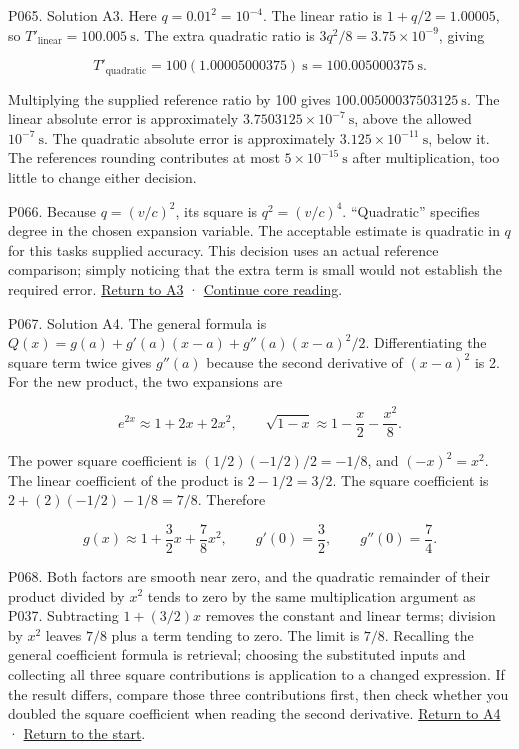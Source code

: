 \documentclass[
  11pt,
]{article}
\begin{document}
P065. Solution A3. Here \(q=0.01^2=10^{-4}\). The linear ratio is
\(1+q/2=1.00005\), so \(T'_{\mathrm{linear}}=100.005\ \mathrm{s}\). The
extra quadratic ratio is \(3q^2/8=3.75\times10^{-9}\), giving

\[
T'_{\mathrm{quadratic}}=100(1.00005000375)\ \mathrm{s}
=100.005000375\ \mathrm{s}.
\]

Multiplying the supplied reference ratio by 100 gives
\(100.00500037503125\ \mathrm{s}\). The linear absolute error is
approximately \(3.7503125\times10^{-7}\ \mathrm{s}\), above the allowed
\(10^{-7}\ \mathrm{s}\). The quadratic absolute error is approximately
\(3.125\times10^{-11}\ \mathrm{s}\), below it. The
reference\textquotesingle s rounding contributes at most
\(5\times10^{-15}\ \mathrm{s}\) after multiplication, too little to
change either decision.

P066. Because \(q=(v/c)^2\), its square is \(q^2=(v/c)^4\).
``Quadratic'' specifies degree in the chosen expansion variable. The
acceptable estimate is quadratic in \(q\) for this
task\textquotesingle s supplied accuracy. This decision uses an actual
reference comparison; simply noticing that the extra term is small would
not establish the required error. \protect\hyperlink{a3}{Return to A3} ·
\protect\hyperlink{after-a3}{Continue core reading}.

P067. Solution A4. The general formula is
\(Q(x)=g(a)+g'(a)(x-a)+g''(a)(x-a)^2/2\). Differentiating the square
term twice gives \(g''(a)\) because the second derivative of \((x-a)^2\)
is 2. For the new product, the two expansions are

\[
e^{2x}\approx1+2x+2x^2,
\qquad
\sqrt{1-x}\approx1-\frac x2-\frac{x^2}{8}.
\]

The power square coefficient is \((1/2)(-1/2)/2=-1/8\), and
\((-x)^2=x^2\). The linear coefficient of the product is \(2-1/2=3/2\).
The square coefficient is \(2+(2)(-1/2)-1/8=7/8\). Therefore

\[
g(x)\approx1+\frac32x+\frac78x^2,
\qquad g'(0)=\frac32,\qquad g''(0)=\frac74.
\]

P068. Both factors are smooth near zero, and the quadratic remainder of
their product divided by \(x^2\) tends to zero by the same
multiplication argument as P037. Subtracting \(1+(3/2)x\) removes the
constant and linear terms; division by \(x^2\) leaves \(7/8\) plus a
term tending to zero. The limit is \(7/8\). Recalling the general
coefficient formula is retrieval; choosing the substituted inputs and
collecting all three square contributions is application to a changed
expression. If the result differs, compare those three contributions
first, then check whether you doubled the square coefficient when
reading the second derivative. \protect\hyperlink{a4}{Return to A4} ·
\protect\hyperlink{start}{Return to the start}.
\end{document}
